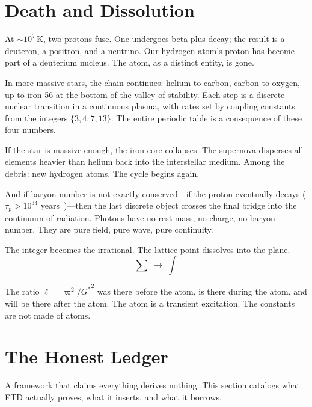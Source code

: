 \documentclass[12pt]{article}
\theoremstyle{compact}
\begin{document}
\section{Death and Dissolution}
\label{sec:death}

At $\sim 10^7$\,K, two protons fuse. One undergoes beta-plus decay; the result is a deuteron, a positron, and a neutrino. Our hydrogen atom's proton has become part of a deuterium nucleus. The atom, as a distinct entity, is gone.

In more massive stars, the chain continues: helium to carbon, carbon to oxygen, up to iron-56 at the bottom of the valley of stability. Each step is a discrete nuclear transition in a continuous plasma, with rates set by coupling constants from the integers $\{3, 4, 7, 13\}$. The entire periodic table is a consequence of these four numbers.

If the star is massive enough, the iron core collapses. The supernova disperses all elements heavier than helium back into the interstellar medium. Among the debris: new hydrogen atoms. The cycle begins again.

And if baryon number is not exactly conserved---if the proton eventually decays ($\tau_p > 10^{34}$ years~\cite{superk})---then the last discrete object crosses the final bridge into the continuum of radiation. Photons have no rest mass, no charge, no baryon number. They are pure field, pure wave, pure continuity.

The integer becomes the irrational. The lattice point dissolves into the plane.
\[
\sum \;\longrightarrow\; \int
\]

The ratio $\ell = \varpi^2/{G^{*}}^2$ was there before the atom, is there during the atom, and will be there after the atom. The atom is a transient excitation. The constants are not made of atoms.


\section{The Honest Ledger}
\label{sec:ledger}

A framework that claims everything derives nothing. This section catalogs what FTD actually proves, what it inserts, and what it borrows.
\end{document}
